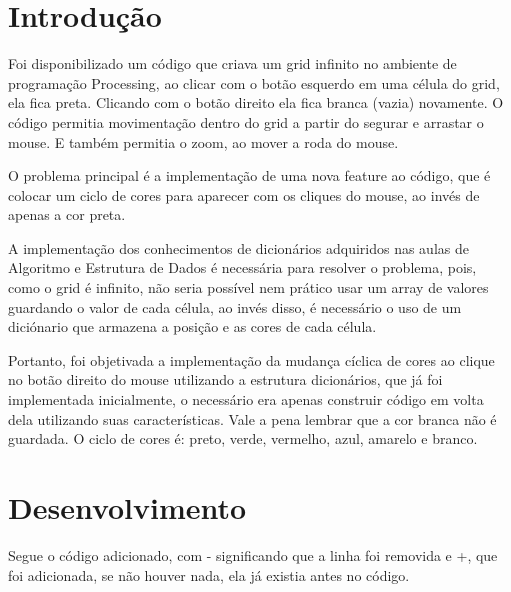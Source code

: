 \documentclass[
	12pt,				%
	oneside,			%
	a4paper,			%
	english,			%
	brazil,				%
	]{abntex2}
\begin{document}
\frenchspacing 

\imprimircapa

{
\ABNTEXchapterfont

\textual

\section{Introdução}

    Foi disponibilizado um código que criava um grid infinito no ambiente de programação Processing, ao clicar com o botão esquerdo em uma célula do grid, ela fica preta. Clicando com o botão direito ela fica branca (vazia) novamente. O código permitia movimentação dentro do grid a partir do segurar e arrastar o mouse. E também permitia o zoom, ao mover a roda do mouse.

    O problema principal é a implementação de uma nova feature ao código, que é colocar um ciclo de cores para aparecer com os cliques do mouse, ao invés de apenas a cor preta.
    
    A implementação dos conhecimentos de dicionários adquiridos nas aulas de Algoritmo e Estrutura de Dados é necessária para resolver o problema, pois, como o grid é infinito, não seria possível nem prático usar um array de valores guardando o valor de cada célula, ao invés disso, é necessário o uso de um diciónario que armazena a posição e as cores de cada célula.

    Portanto, foi objetivada a implementação da mudança cíclica de cores ao clique no botão direito do mouse utilizando a estrutura dicionários, que já foi implementada inicialmente, o necessário era apenas construir código em volta dela utilizando suas características. Vale a pena lembrar que a cor branca não é guardada. O ciclo de cores é: preto, verde, vermelho, azul, amarelo e branco.

\section{Desenvolvimento}

Segue o código adicionado, com - significando que a linha foi removida e +, que foi adicionada, se não houver nada, ela já existia antes no código.

}
\end{document}
